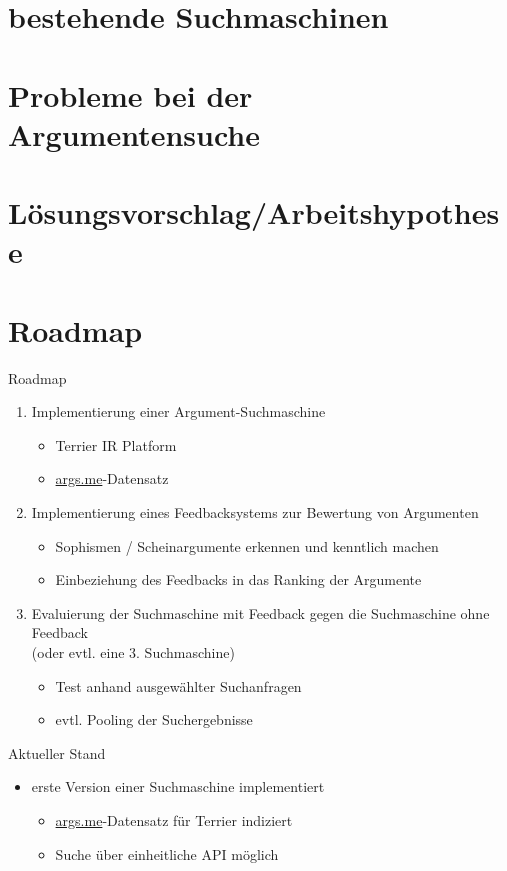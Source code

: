 \documentclass{beamer}
\begin{document}
	\section{bestehende Suchmaschinen}
	\section{Probleme bei der Argumentensuche}
	\section{Lösungsvorschlag/Arbeitshypothese}

	\section{Roadmap}
	\begin{frame}{Roadmap}
		\begin{enumerate}
			\item Implementierung einer Argument-Suchmaschine
			\begin{itemize}
				\item Terrier IR Platform
				\item \url{args.me}-Datensatz
			\end{itemize}
			\item Implementierung eines Feedbacksystems zur Bewertung von Argumenten
			\begin{itemize}
				\item Sophismen / Scheinargumente erkennen und kenntlich machen
				\item Einbeziehung des Feedbacks in das Ranking der Argumente
			\end{itemize}
			\item Evaluierung der Suchmaschine mit Feedback gegen die Suchmaschine ohne Feedback\\(oder evtl. eine 3. Suchmaschine)
			\begin{itemize}
				\item Test anhand ausgewählter Suchanfragen
				\item evtl. Pooling der Suchergebnisse
			\end{itemize}
		\end{enumerate}
	\end{frame}
	\begin{frame}{Aktueller Stand}
		\begin{itemize}
			\item erste Version einer Suchmaschine implementiert
			\begin{itemize}
				\item \url{args.me}-Datensatz für Terrier indiziert
				\item Suche über einheitliche API möglich
			\end{itemize}
		\end{itemize}
	\end{frame}
\end{document}
